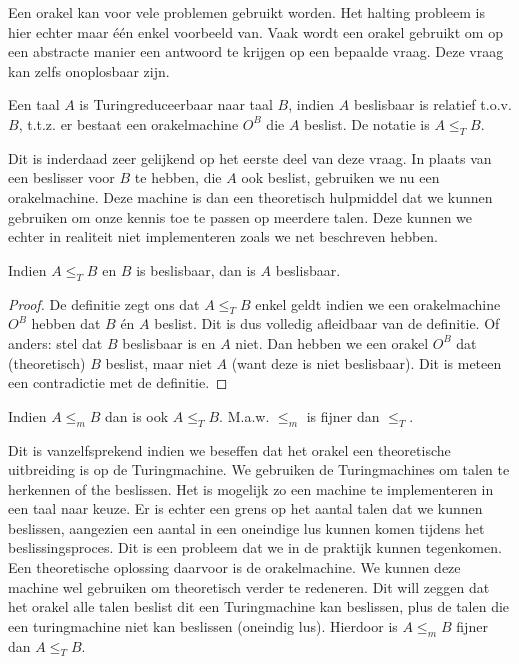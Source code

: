Een orakel kan voor vele problemen gebruikt worden. Het halting probleem is hier echter maar \'e\'en enkel voorbeeld van. Vaak wordt een orakel gebruikt om op een abstracte manier een antwoord te krijgen op een bepaalde vraag. Deze vraag kan zelfs onoplosbaar zijn.

\begin{theorem}[Turingreduceerbaar]
	Een taal $A$ is Turingreduceerbaar naar taal $B$, indien $A$ beslisbaar is relatief t.o.v. $B$, t.t.z. er bestaat een orakelmachine $O^B$ die $A$ beslist. De notatie is $A \leq_T B$.
\end{theorem}

Dit is inderdaad zeer gelijkend op het eerste deel van deze vraag. In plaats van een beslisser voor $B$ te hebben, die $A$ ook beslist, gebruiken we nu een orakelmachine. Deze machine is dan een theoretisch hulpmiddel dat we kunnen gebruiken om onze kennis toe te passen op meerdere talen. Deze kunnen we echter in realiteit niet implementeren zoals we net beschreven hebben.

\begin{theorem}
	Indien $A \leq_T B$ en $B$ is beslisbaar, dan is $A$ beslisbaar.
\end{theorem}

\begin{proof}
	De definitie zegt ons dat $A \leq_T B$ enkel geldt indien we een orakelmachine $O^B$ hebben dat $B$ \'en $A$ beslist. Dit is dus volledig afleidbaar van de definitie. Of anders: stel dat $B$ beslisbaar is en $A$ niet. Dan hebben we een orakel $O^B$ dat (theoretisch) $B$ beslist, maar niet $A$ (want deze is niet beslisbaar). Dit is meteen een contradictie met de definitie.
\end{proof}

\begin{theorem}
	Indien $A \leq_m B$ dan is ook $A \leq_T B$. M.a.w. $\leq_m$ is fijner dan $\leq_T$.
\end{theorem}

Dit is vanzelfsprekend indien we beseffen dat het orakel een theoretische uitbreiding is op de Turingmachine. We gebruiken de Turingmachines om talen te herkennen of the beslissen. Het is mogelijk zo een machine te implementeren in een taal naar keuze. Er is echter een grens op het aantal talen dat we kunnen beslissen, aangezien een aantal in een oneindige lus kunnen komen tijdens het beslissingsproces. Dit is een probleem dat we in de praktijk kunnen tegenkomen. Een theoretische oplossing daarvoor is de orakelmachine. We kunnen deze machine wel gebruiken om theoretisch verder te redeneren. Dit will zeggen dat het orakel alle talen beslist dit een Turingmachine kan beslissen, plus de talen die een turingmachine niet kan beslissen (oneindig lus). Hierdoor is $A \leq_m B$ fijner dan $A \leq_T B$.
